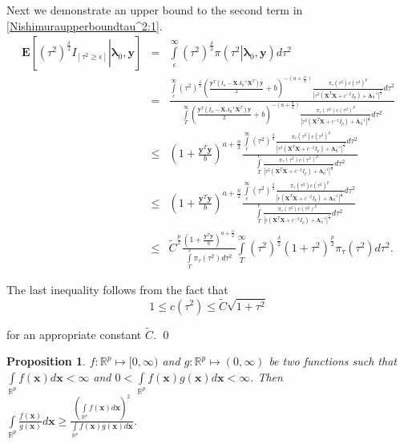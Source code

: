 \documentclass[noinfoline,11pt]{imsart}
\numberwithin{equation}{section}
\theoremstyle{plain}
\newtheorem{prop}{Proposition}[section]
\newcommand{\y}{\mathbf{y}}
\newcommand{\X}{\mathbf{X}}
\newcommand{\bl}{\boldsymbol{\lambda}}
\newcommand{\Bl}{\boldsymbol{\Lambda}}
\newcommand{\E}{\boldsymbol{E}}
\begin{document}
\noindent
Next we demonstrate an upper bound to the second term in \eqref{Nishimuraupperboundtau^2:1}.
\begin{eqnarray}
 \E\left[\left.\left(\tau^2\right)^{\frac{\delta}{2}}I_{\left[\tau^2\geq\epsilon\right]}\right| \bl_0,\y\right]&=&\int\limits_{\epsilon}^\infty\left(\tau^2\right)^{\frac{\delta}{2}}\pi\left(\left.\tau^2\right|\bl_0,\y\right)d\tau^2\nonumber \\
 &=& \frac{\int\limits_{\epsilon}^\infty\left(\tau^2\right)^{\frac{\delta}{2}}\left(\frac{\y^T\left(I_n-\X A_0^{-1}\X^T\right)\y}{2}+b\right)^{-\left(a+\frac{n}{2}\right)}\frac{\pi_\tau\left(\tau^2\right) c(\tau^2)^p}{\left|\tau^2\left(\X^T\X+c^{-2}I_p\right)+\Bl_0^{-1}\right|^{\frac{1}{2}}}d\tau^2}{\int\limits_{T}^\infty\left(\frac{\y^T\left(I_n-\X A_0^{-1}\X^T\right)\y}{2}+b\right)^{-\left(a+\frac{n}{2}\right)}\frac{\pi_\tau\left(\tau^2\right) c(\tau^2)^p}{\left|\tau^2\left(\X^T\X+c^{-2}I_p\right)+\Bl_0^{-1}\right|^{\frac{1}{2}}}d\tau^2}\nonumber \\
 &\leq& \left(1+\frac{\y^T\y}{b}\right)^{a+\frac{n}{2}}\frac{\int\limits_{\epsilon}^\infty\left(\tau^2\right)^{\frac{\delta}{2}}\frac{\pi_\tau\left(\tau^2\right) c(\tau^2)^p}{\left|\tau^2\left(\X^T\X+c^{-2}I_p\right)+\Bl_0^{-1}\right|^{\frac{1}{2}}}d\tau^2}{\int\limits_{T}^\epsilon\frac{\pi_\tau\left(\tau^2\right)c(\tau^2)^p}{\left|\tau^2\left(\X^T\X+c^{-2}I_p\right)+\Bl_0^{-1}\right|^{\frac{1}{2}}}d\tau^2}\nonumber \\
 &\leq& \left(1+\frac{\y^T\y}{b}\right)^{a+\frac{n}{2}}\frac{\int\limits_{\epsilon}^\infty\left(\tau^2\right)^{\frac{\delta}{2}}\frac{\pi_\tau\left(\tau^2\right) c(\tau^2)^p}{\left|\epsilon\left(\X^T\X+c^{-2}I_p\right)+\Bl_0^{-1}\right|^{\frac{1}{2}}}d\tau^2}{\int\limits_{T}^\epsilon\frac{\pi_\tau\left(\tau^2\right)c(\tau^2)^p}{\left|\epsilon\left(\X^T\X+c^{-2}I_p\right)+\Bl_0^{-1}\right|^{\frac{1}{2}}}d\tau^2}\nonumber \\
 &\leq& \tilde{C}^{\frac{p}{2}}\frac{\left(1+\frac{\y^T\y}{b}\right)^{a+\frac{n}{2}}}{\int\limits_{T}^\epsilon\pi_\tau\left(\tau^2\right)d\tau^2}\int\limits_{T}^\infty\left(\tau^2\right)^{\frac{\delta}{2}}\left(1+\tau^2\right)^{\frac{p}{2}}\pi_\tau\left(\tau^2\right)d\tau^2.  
\end{eqnarray}

\noindent
The last inequality follows from the fact that 
$$
1 \leq c(\tau^2) \leq \tilde{C} \sqrt{1 + \tau^2} 
$$

\noindent
for an appropriate constant $\tilde{C}$. \qed

\begin{prop}\label{cauchyschwarzinequality}
$f:\mathbb{R}^p\mapsto [0,\infty)$ and $g:\mathbb{R}^p\mapsto (0,\infty)$ be two functions such that $\int\limits_{\mathbb{R}^p} f(\boldsymbol{x})d\boldsymbol{x}<\infty$ and  $0<\int\limits_{\mathbb{R}^p} f(\boldsymbol{x})g(\boldsymbol{x})d\boldsymbol{x}<\infty$. Then $\int\limits_{\mathbb{R}^p}\frac{f(\boldsymbol{x})}{g(\boldsymbol{x})}d\boldsymbol{x}\geq \frac{\left(\int\limits_{\mathbb{R}^p} f(\boldsymbol{x})d\boldsymbol{x}\right)^2}{\int\limits_{\mathbb{R}^p} f(\boldsymbol{x})g(\boldsymbol{x})d\boldsymbol{x}}$.
\end{prop}
\end{document}
